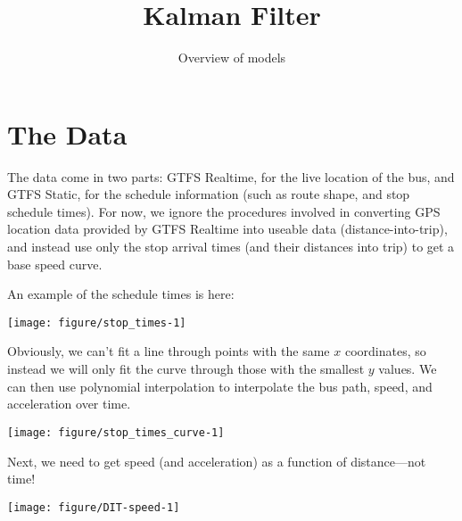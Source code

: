 \documentclass[11pt]{article}\usepackage[]{graphicx}\usepackage[]{color}
\title{Kalman Filter}
\author{Overview of models}
\date{}
\newenvironment{knitrout}{}{} %
\begin{document}
\maketitle



\section{The Data}

The data come in two parts: GTFS Realtime, for the live location of the bus, and GTFS
Static, for the schedule information (such as route shape, and stop schedule times).  
For now, we ignore the procedures involved in converting GPS location data provided by 
GTFS Realtime into useable data (distance-into-trip), and instead use only the stop arrival
times (and their distances into trip) to get a base speed curve.

An example of the schedule times is here:
\begin{knitrout}
\color{fgcolor}

{\centering \texttt{[image: figure/stop\_times-1]} 

}



\end{knitrout}

Obviously, we can't fit a line through points with the same $x$ coordinates, so instead we will only fit the curve
through those with the smallest $y$ values.
We can then use polynomial interpolation to interpolate the bus path, speed, and acceleration over time.
\begin{knitrout}
\color{fgcolor}

{\centering \texttt{[image: figure/stop\_times\_curve-1]} 

}



\end{knitrout}

Next, we need to get speed (and acceleration) as a function of distance---not time!

\begin{knitrout}
\color{fgcolor}

{\centering \texttt{[image: figure/DIT-speed-1]} 

}



\end{knitrout}
\end{document}
